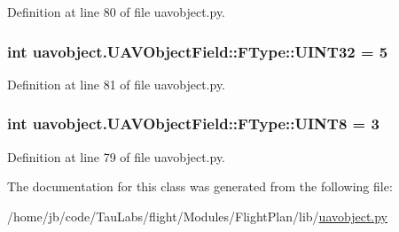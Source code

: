 \-Definition at line 80 of file uavobject.\-py.

\hypertarget{classuavobject_1_1_u_a_v_object_field_1_1_f_type_afcf08fbf67c651d9b551ffc4c15c200e}{
\subsubsection[{\-U\-I\-N\-T32}]{\setlength{\rightskip}{0pt plus 5cm}int {\bf uavobject.\-U\-A\-V\-Object\-Field\-::\-F\-Type\-::\-U\-I\-N\-T32} = 5}}\label{classuavobject_1_1_u_a_v_object_field_1_1_f_type_afcf08fbf67c651d9b551ffc4c15c200e}


\-Definition at line 81 of file uavobject.\-py.

\hypertarget{classuavobject_1_1_u_a_v_object_field_1_1_f_type_a25effac9bf8655551f13307d0fe57409}{
\subsubsection[{\-U\-I\-N\-T8}]{\setlength{\rightskip}{0pt plus 5cm}int {\bf uavobject.\-U\-A\-V\-Object\-Field\-::\-F\-Type\-::\-U\-I\-N\-T8} = 3}}\label{classuavobject_1_1_u_a_v_object_field_1_1_f_type_a25effac9bf8655551f13307d0fe57409}


\-Definition at line 79 of file uavobject.\-py.



\-The documentation for this class was generated from the following file\-:\begin{DoxyCompactItemize}
\item 
/home/jb/code/\-Tau\-Labs/flight/\-Modules/\-Flight\-Plan/lib/\hyperlink{uavobject_8py}{uavobject.\-py}\end{DoxyCompactItemize}
